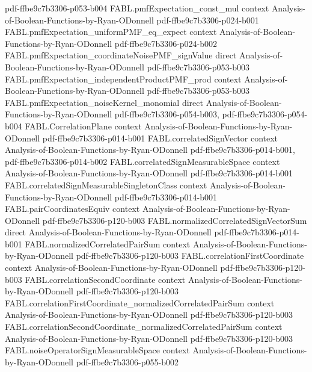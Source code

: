 \begin{theorem}
  {pdf-ffbe9c7b3306-p053-b004}
\proofstep
  {FABL.pmfExpectation_const_mul}
  {context}
  {Analysis-of-Boolean-Functions-by-Ryan-ODonnell}
  {pdf-ffbe9c7b3306-p024-b001}
\proofstep
  {FABL.pmfExpectation_uniformPMF_eq_expect}
  {context}
  {Analysis-of-Boolean-Functions-by-Ryan-ODonnell}
  {pdf-ffbe9c7b3306-p024-b002}
\proofstep
  {FABL.pmfExpectation_coordinateNoisePMF_signValue}
  {direct}
  {Analysis-of-Boolean-Functions-by-Ryan-ODonnell}
  {pdf-ffbe9c7b3306-p053-b003}
\proofstep
  {FABL.pmfExpectation_independentProductPMF_prod}
  {context}
  {Analysis-of-Boolean-Functions-by-Ryan-ODonnell}
  {pdf-ffbe9c7b3306-p053-b003}
\proofstep
  {FABL.pmfExpectation_noiseKernel_monomial}
  {direct}
  {Analysis-of-Boolean-Functions-by-Ryan-ODonnell}
  {pdf-ffbe9c7b3306-p054-b003,
    pdf-ffbe9c7b3306-p054-b004}
\proofstep
  {FABL.CorrelationPlane}
  {context}
  {Analysis-of-Boolean-Functions-by-Ryan-ODonnell}
  {pdf-ffbe9c7b3306-p014-b001}
\proofstep
  {FABL.correlatedSignVector}
  {context}
  {Analysis-of-Boolean-Functions-by-Ryan-ODonnell}
  {pdf-ffbe9c7b3306-p014-b001,
    pdf-ffbe9c7b3306-p014-b002}
\proofstep
  {FABL.correlatedSignMeasurableSpace}
  {context}
  {Analysis-of-Boolean-Functions-by-Ryan-ODonnell}
  {pdf-ffbe9c7b3306-p014-b001}
\proofstep
  {FABL.correlatedSignMeasurableSingletonClass}
  {context}
  {Analysis-of-Boolean-Functions-by-Ryan-ODonnell}
  {pdf-ffbe9c7b3306-p014-b001}
\proofstep
  {FABL.pairCoordinatesEquiv}
  {context}
  {Analysis-of-Boolean-Functions-by-Ryan-ODonnell}
  {pdf-ffbe9c7b3306-p120-b003}
\proofstep
  {FABL.normalizedCorrelatedSignVectorSum}
  {direct}
  {Analysis-of-Boolean-Functions-by-Ryan-ODonnell}
  {pdf-ffbe9c7b3306-p014-b001}
\proofstep
  {FABL.normalizedCorrelatedPairSum}
  {context}
  {Analysis-of-Boolean-Functions-by-Ryan-ODonnell}
  {pdf-ffbe9c7b3306-p120-b003}
\proofstep
  {FABL.correlationFirstCoordinate}
  {context}
  {Analysis-of-Boolean-Functions-by-Ryan-ODonnell}
  {pdf-ffbe9c7b3306-p120-b003}
\proofstep
  {FABL.correlationSecondCoordinate}
  {context}
  {Analysis-of-Boolean-Functions-by-Ryan-ODonnell}
  {pdf-ffbe9c7b3306-p120-b003}
\proofstep
  {FABL.correlationFirstCoordinate_normalizedCorrelatedPairSum}
  {context}
  {Analysis-of-Boolean-Functions-by-Ryan-ODonnell}
  {pdf-ffbe9c7b3306-p120-b003}
\proofstep
  {FABL.correlationSecondCoordinate_normalizedCorrelatedPairSum}
  {context}
  {Analysis-of-Boolean-Functions-by-Ryan-ODonnell}
  {pdf-ffbe9c7b3306-p120-b003}
\proofstep
  {FABL.noiseOperatorSignMeasurableSpace}
  {context}
  {Analysis-of-Boolean-Functions-by-Ryan-ODonnell}
  {pdf-ffbe9c7b3306-p055-b002}

\end{theorem}
